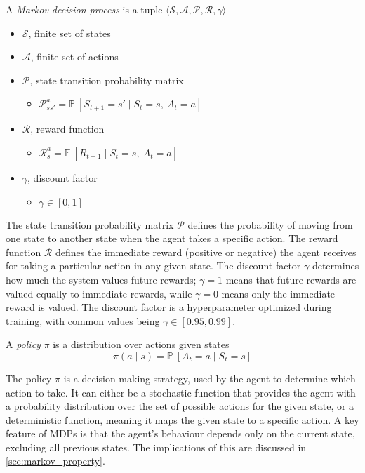 \begin{definition}
  A \textit{Markov decision process} is a tuple $\langle\mathcal{S}, \mathcal{A}, \mathcal{P}, \mathcal{R}, \gamma\rangle$
  \begin{itemize}[label={}]
    \item $\mathcal{S}$, finite set of states
    \item $\mathcal{A}$, finite set of actions
    \item $\mathcal{P}$, state transition probability matrix
          \begin{itemize}[label={}]
            \item $\mathcal{P}_{ss'}^a = \mathbb{P}~[S_{t+1}=s'\mid S_t=s,~A_t=a]$
          \end{itemize}
    \item $\mathcal{R}$, reward function
          \begin{itemize}[label={}]
            \item $\mathcal{R}_{s}^a = \mathbb{E}~[R_{t+1}\mid S_t=s,~A_t=a]$
          \end{itemize}
    \item $\gamma$, discount factor
          \begin{itemize}[label={}]
            \item $\gamma\in[0,1]$
          \end{itemize}
  \end{itemize}
\end{definition}

The state transition probability matrix $\mathcal{P}$ defines the probability
of moving from one state to another state when the agent takes a specific
action. The reward function $\mathcal{R}$ defines the immediate reward
(positive or negative) the agent receives for taking a particular action in any
given state. The discount factor $\gamma$ determines how much the system values
future rewards; $\gamma = 1$ means that future rewards are valued equally to
immediate rewards, while $\gamma = 0$ means only the immediate reward is
valued. The discount factor is a hyperparameter optimized during training, with
common values being $\gamma\in[0.95,0.99]$.

\begin{definition}
  A \textit{policy} $\pi$ is a distribution over actions given states
  $$\pi(a\mid s)=\mathbb{P}~[A_t=a\mid S_t=s]$$
\end{definition}

The policy $\pi$ is a decision-making strategy, used by the agent to determine
which action to take. It can either be a stochastic function that provides the
agent with a probability distribution over the set of possible actions for the
given state, or a deterministic function, meaning it maps the given state to a
specific action. A key feature of MDPs is that the agent's behaviour depends
only on the current state, excluding all previous states. The implications of
this are discussed in \autoref{sec:markov_property}.

